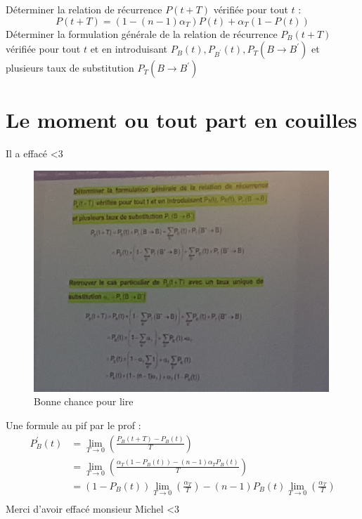 \documentclass[11pt,a4paper]{article}
\begin{document}
	Déterminer la relation de récurrence $P(t + T)$ vérifiée pour tout $t$ :\\
	$$P(t + T) = (1 - (n - 1)\alpha_{T})P(t) + \alpha_{T}(1 - P(t))$$
	Déterminer la formulation générale de la relation de récurrence $P_{B}(t + T)$ vérifiée pour tout $t$ et en introduisant $P_{B}(t), P_{B^{\prime}}(t), P_{T}(B \to B^{\prime})$ et plusieurs taux de substitution $P_{T}(B \to B^{\prime})$
	
	\newpage
	
	\section{Le moment ou tout part en couilles}
	
	Il a effacé <3\\
	
	\begin{figure}[ht]
		\centering
		\includegraphics[width=0.99\textwidth]{img/cQuoiCetteMerde.jpg}
		\caption{Bonne chance pour lire}
	\end{figure}
	
	
	Une formule au pif par le prof :\\
	
	\begin{align*}
		P^{\prime}_{B}(t) &= \lim\limits_{T \to 0}\left(\frac{P_{B}(t + T) - P_{B}(t)}{T}\right)\\
		&= \lim\limits_{T \to 0}\left(\frac{\alpha_{T}(1 - P_{B}(t)) - (n - 1)\alpha_{T}P_{B}(t)}{T}\right)\\
		&= (1 - P_{B}(t)) \lim\limits_{T \to 0}\left(\frac{\alpha_{T}}{T}\right) - (n - 1) P_{B}(t)\lim\limits_{T \to 0}\left(\frac{\alpha_{T}}{T}\right)\\
	\end{align*}
	Merci d'avoir effacé monsieur Michel <3\\
	
\end{document}
